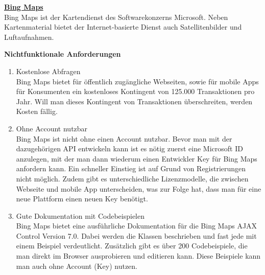 \textbf{\underline{Bing Maps}}\\
Bing Maps ist der Kartendienst des Softwarekonzerns Microsoft. Neben Kartenmaterial bietet der Internet-basierte Dienst auch Satellitenbilder und Luftaufnahmen.

\textbf{Nichtfunktionale Anforderungen}
\begin{enumerate}
\item Kostenlose Abfragen \\
Bing Maps bietet für öffentlich zugängliche Webseiten, sowie für mobile Apps für Konsumenten ein kostenloses Kontingent von 125.000 Transaktionen pro Jahr. Will man dieses Kontingent von Transaktionen überschreiten, werden Kosten fällig.

\item Ohne Account nutzbar\\
Bing Maps ist nicht ohne einen Account nutzbar. Bevor man mit der dazugehörigen API entwickeln kann ist es nötig zuerst eine Microsoft ID anzulegen, mit der man dann wiederum einen Entwickler Key für Bing Maps anfordern kann. Ein schneller Einstieg ist auf Grund von Registrierungen nicht möglich. Zudem gibt es unterschiedliche Lizenzmodelle, die zwischen Webseite und mobile App unterscheiden, was zur Folge hat, dass man für eine neue Plattform einen neuen Key benötigt.

\item Gute Dokumentation mit Codebeispielen\\
Bing Maps bietet eine ausführliche Dokumentation für die Bing Maps AJAX Control Version 7.0. Dabei werden die Klassen beschrieben und fast jede mit einem Beispiel verdeutlicht. 
Zusätzlich gibt es über 200 Codebeispiele, die man direkt im Browser ausprobieren und editieren kann. Diese Beispiele kann man auch ohne Account (Key) nutzen.

\end{enumerate}




